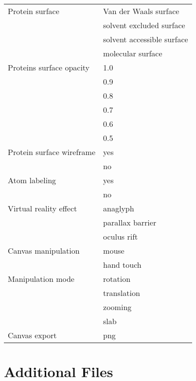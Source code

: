 \documentclass[twocolumn]{bmcart}%
\begin{document}
\begin{backmatter}
\begin{table}[h!]
\begin{tabular}{ll}
        \hline
          Protein surface & Van der Waals surface\\
                          & solvent excluded surface\\
                          & solvent accessible surface\\
                          & molecular surface\\
        \hline
 Proteins surface opacity & 1.0\\
                          & 0.9\\
                          & 0.8\\
                          & 0.7\\
                          & 0.6\\
                          & 0.5\\
        \hline
Protein surface wireframe & yes\\
                          & no\\
        \hline
            Atom labeling & yes\\
                          & no\\
        \hline
   Virtual reality effect & anaglyph\\
                          & parallax barrier\\
                          & oculus rift\\
        \hline
      Canvas manipulation & mouse\\
                          & hand touch\\
        \hline
        Manipulation mode & rotation\\
                          & translation\\
                          & zooming\\
                          & slab\\
        \hline
            Canvas export & png\\
        \hline
      \end{tabular}
\end{table}


\section*{Additional Files}

\end{backmatter}
\end{document}
